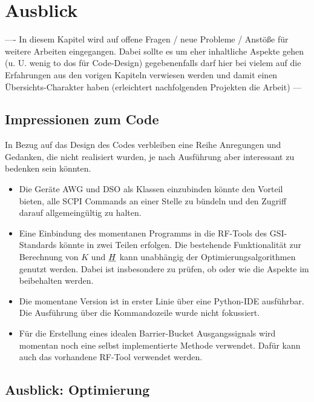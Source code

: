 \documentclass[../Report.tex]{subfiles}
\begin{document}
\chapter{Ausblick}
\label{chap:ausb}
---- In diesem Kapitel wird auf offene Fragen / neue Probleme / Anstöße für weitere Arbeiten eingegangen. Dabei sollte es um eher inhaltliche Aspekte gehen (u. U. wenig to dos für Code-Design) gegebenenfalls darf hier bei vielem auf die Erfahrungen aus den vorigen Kapiteln verwiesen werden und damit einen Übersichts-Charakter haben (erleichtert nachfolgenden Projekten die Arbeit) --- 

\section{Impressionen zum Code}
\label{sec:ausb.code}
In Bezug auf das Design des Codes verbleiben eine Reihe Anregungen und Gedanken, die nicht realisiert wurden, je nach Ausführung aber interessant zu bedenken sein könnten.

\begin{itemize}
	\item	Die Geräte AWG und DSO als Klassen einzubinden könnte den Vorteil bieten, alle SCPI Commands an einer Stelle zu bündeln und den Zugriff darauf allgemeingültig zu halten.
	
	\item	Eine Einbindung des momentanen Programms in die RF-Tools des GSI-Standards könnte in zwei Teilen erfolgen. Die bestehende Funktionalität zur Berechnung von $K$ und $\underline{H}$ kann unabhängig der Optimierungsalgorithmen genutzt werden. Dabei ist insbesondere zu prüfen, ob oder wie die Aspekte im  beibehalten werden. 
	
	\item 	Die momentane Version ist in erster Linie über eine Python-IDE ausführbar. Die Ausführung über die Kommandozeile wurde nicht fokussiert.
	\item Für die Erstellung eines idealen Barrier-Bucket Ausgangssignals wird momentan noch eine selbst implementierte Methode verwendet. Dafür kann auch das vorhandene RF-Tool verwendet werden.
	
\end{itemize}





\section{Ausblick: Optimierung}
\label{sec:ausb.opti}
\end{document}
